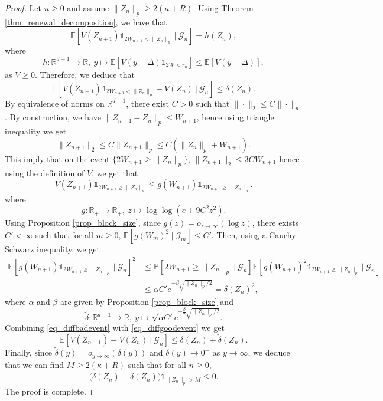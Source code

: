 \documentclass[10pt,a4paper]{amsart}
\newcommand{\E}{\mathbb{E}}
\newcommand{\R}{\mathbb{R}}
\renewcommand{\P}{\mathbb{P}}
\begin{document}
\begin{proof}
    Let $n\geq 0$ and assume $\|Z_n\|_p\geq 2(\kappa+R)$. Using Theorem \ref{thm_renewal_decomposition}, we have that
        \[\E[V(Z_{n+1})\mathds 1_{2W_{n+1}<\|Z_n\|_p}~|~\mathcal G_n]=h(Z_n),\]
    where
        \[h:\R^{d-1}\to\R,~y\mapsto\E[V(y+\Delta)\mathds 1_{2W<r_n}]\leq\E[V(y+\Delta)],\]
    as $V\geq0$. Therefore, we deduce that
        \begin{equation}
            \label{eq_diffgoodevent}
            \E[V(Z_{n+1})\mathds 1_{2W_{n+1}<\|Z_n\|_p}-V(Z_n)~|~\mathcal G_n]\leq\delta(Z_n).
        \end{equation}
    By equivalence of norms on $\R^{d-1}$, there exist $C>0$ such that $\|\cdot\|_2\leq C\|\cdot\|_p$. By construction, we have $\|Z_{n+1}-Z_n\|_p\leq W_{n+1}$, hence using triangle inequality we get
        \[\|Z_{n+1}\|_2\leq C\|Z_{n+1}\|_p\leq C(\|Z_n\|_p+W_{n+1}).\]
    This imply that on the event $\{2W_{n+1}\geq\|Z_n\|_p\}$, $\|Z_{n+1}\|_2\leq 3CW_{n+1}$ hence using the definition of $V$, we get that
        \[V(Z_{n+1})\mathds 1_{2W_{n+1}\geq\|Z_n\|_p}\leq g(W_{n+1})\mathds 1_{2W_{n+1}\geq\|Z_n\|_p}.\]
    where
        \[g:\R_+\to\R_+,~z\mapsto\log\log(e+9C^2z^2).\]
    Using Proposition \ref{prop_block_size}, since $g(z)=o_{z\to\infty}(\log z)$, there exists $C'<\infty$ such that for all $m\geq 0$, $\E[g(W_m)^2~|~\mathcal G_m]\leq C'$. Then, using a Cauchy-Schwarz inequality, we get
        \begin{equation}
            \begin{split}
                \label{eq_diffbadevent}
                \E[g(W_{n+1})\mathds 1_{2W_{n+1}\geq \|Z_n\|_p}~|~\mathcal G_n]^2&\leq\P[2W_{n+1}\geq\|Z_n\|_p~|~\mathcal G_n]\E[g(W_{n+1})^2\mathds 1_{2W_{n+1}\geq\|Z_n\|_p}~|~\mathcal G_n]\\
                &\leq\alpha C'e^{-\beta\sqrt{\|Z_n\|_p/2}}=\tilde\delta(Z_n)^2,
            \end{split}
        \end{equation}
    where $\alpha$ and $\beta$ are given by Proposition \ref{prop_block_size} and 
        \[\tilde\delta:\R^{d-1}\to\R,~y\mapsto\sqrt{\alpha C'}e^{-\frac{\beta}{2}\sqrt{\|Z_n\|_p/2}}.\]
    Combining \eqref{eq_diffbadevent} with \eqref{eq_diffgoodevent} we get
        \[\E[V(Z_{n+1})-V(Z_n)~|~\mathcal G_n]\leq \delta(Z_n)+\tilde\delta(Z_n).\]
    Finally, since $\tilde\delta(y)=o_{y\to\infty}(\delta(y))$ and $\delta(y)\to 0^-$ as $y\to\infty$, we deduce that we can find $M\geq2(\kappa+R)$ such that for all $n\geq 0$, 
        \[\big(\delta(Z_n)+\tilde\delta(Z_n)\big)\mathds 1_{\|Z_n\|_p>M}\leq 0.\]
    The proof is complete.
    

\end{proof}
\end{document}
